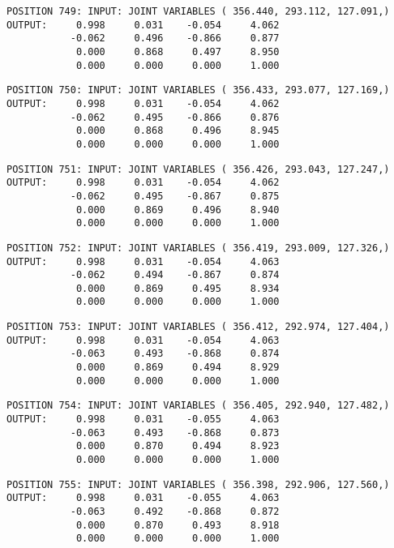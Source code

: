 \begin{verbatim}
POSITION 749: INPUT: JOINT VARIABLES ( 356.440, 293.112, 127.091,)
OUTPUT:     0.998     0.031    -0.054     4.062
           -0.062     0.496    -0.866     0.877
            0.000     0.868     0.497     8.950
            0.000     0.000     0.000     1.000
\end{verbatim} \pagebreak[1]\begin{verbatim}
POSITION 750: INPUT: JOINT VARIABLES ( 356.433, 293.077, 127.169,)
OUTPUT:     0.998     0.031    -0.054     4.062
           -0.062     0.495    -0.866     0.876
            0.000     0.868     0.496     8.945
            0.000     0.000     0.000     1.000
\end{verbatim} \pagebreak[1]\begin{verbatim}
POSITION 751: INPUT: JOINT VARIABLES ( 356.426, 293.043, 127.247,)
OUTPUT:     0.998     0.031    -0.054     4.062
           -0.062     0.495    -0.867     0.875
            0.000     0.869     0.496     8.940
            0.000     0.000     0.000     1.000
\end{verbatim} \pagebreak[1]\begin{verbatim}
POSITION 752: INPUT: JOINT VARIABLES ( 356.419, 293.009, 127.326,)
OUTPUT:     0.998     0.031    -0.054     4.063
           -0.062     0.494    -0.867     0.874
            0.000     0.869     0.495     8.934
            0.000     0.000     0.000     1.000
\end{verbatim} \pagebreak[1]\begin{verbatim}
POSITION 753: INPUT: JOINT VARIABLES ( 356.412, 292.974, 127.404,)
OUTPUT:     0.998     0.031    -0.054     4.063
           -0.063     0.493    -0.868     0.874
            0.000     0.869     0.494     8.929
            0.000     0.000     0.000     1.000
\end{verbatim} \pagebreak[1]\begin{verbatim}
POSITION 754: INPUT: JOINT VARIABLES ( 356.405, 292.940, 127.482,)
OUTPUT:     0.998     0.031    -0.055     4.063
           -0.063     0.493    -0.868     0.873
            0.000     0.870     0.494     8.923
            0.000     0.000     0.000     1.000
\end{verbatim} \pagebreak[1]\begin{verbatim}
POSITION 755: INPUT: JOINT VARIABLES ( 356.398, 292.906, 127.560,)
OUTPUT:     0.998     0.031    -0.055     4.063
           -0.063     0.492    -0.868     0.872
            0.000     0.870     0.493     8.918
            0.000     0.000     0.000     1.000
\end{verbatim} \pagebreak[1]\begin{verbatim}

\end{verbatim}
